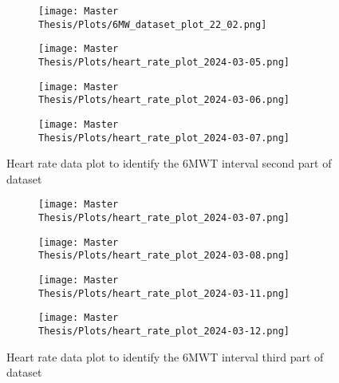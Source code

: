 \FloatBarrier
\begin{figure}[h!]
  \centering
  \begin{subfigure}{.55\textwidth}
    \centering
    \texttt{[image: Master Thesis/Plots/6MW\_dataset\_plot\_22\_02.png]}
    \caption{}
    \label{fig:test4}
  \end{subfigure}%
  \begin{subfigure}{.55\textwidth}
    \centering
    \texttt{[image: Master Thesis/Plots/heart\_rate\_plot\_2024-03-05.png]}
    \caption{}
    \label{fig:test5}
  \end{subfigure}
  \newline
  \begin{subfigure}{.55\textwidth}
    \centering
    \texttt{[image: Master Thesis/Plots/heart\_rate\_plot\_2024-03-06.png]}
    \caption{}
    \label{fig:test6}
  \end{subfigure}%
  \begin{subfigure}{.55\textwidth}
    \centering
    \texttt{[image: Master Thesis/Plots/heart\_rate\_plot\_2024-03-07.png]}
    \caption{}
    \label{fig:test7}
  \end{subfigure}
  \caption{Heart rate data plot to identify the 6MWT interval second part of dataset}
  \label{fig:allintervall6mwt2}
\end{figure}
\FloatBarrier

\FloatBarrier
\begin{figure}[h!]
  \centering
  \begin{subfigure}{.55\textwidth}
    \centering
    \texttt{[image: Master Thesis/Plots/heart\_rate\_plot\_2024-03-07.png]}
    \caption{}
    \label{fig:test8}
  \end{subfigure}%
  \begin{subfigure}{.55\textwidth}
    \centering
    \texttt{[image: Master Thesis/Plots/heart\_rate\_plot\_2024-03-08.png]}
    \caption{}
    \label{fig:test9}
  \end{subfigure}
  \newline
  \begin{subfigure}{.55\textwidth}
    \centering
    \texttt{[image: Master Thesis/Plots/heart\_rate\_plot\_2024-03-11.png]}
    \caption{}
    \label{fig:test10}
  \end{subfigure}%
  \begin{subfigure}{.55\textwidth}
    \centering
    \texttt{[image: Master Thesis/Plots/heart\_rate\_plot\_2024-03-12.png]}
    \caption{}
    \label{fig:test11}
  \end{subfigure}
  \caption{Heart rate data plot to identify the 6MWT interval third part of dataset}
  \label{fig:allintervall6mwt3}
\end{figure}
\FloatBarrier

